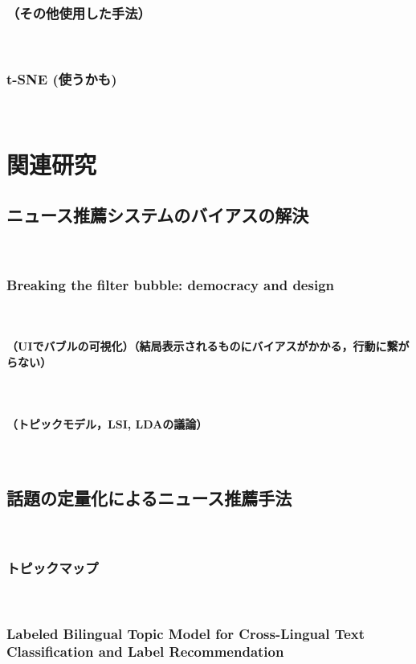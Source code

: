 \documentclass[12pt,a4j]{jreport}
\begin{document}
\subsection{（その他使用した手法）}
~

\subsection{t-SNE (使うかも)}
~


\chapter{関連研究}


\section{ニュース推薦システムのバイアスの解決}
~

\subsection{Breaking the filter bubble: democracy and design}
~

\subsubsection{（UIでバブルの可視化）（結局表示されるものにバイアスがかかる，行動に繋がらない）}
~

\subsubsection{（トピックモデル，LSI, LDAの議論）}
~

\section{話題の定量化によるニュース推薦手法}
~

\subsection{トピックマップ}
~

\subsection{Labeled Bilingual Topic Model for Cross-Lingual Text Classification and Label Recommendation}
~
\end{document}
